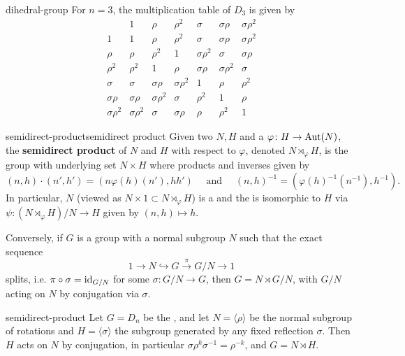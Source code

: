 \begin{example}{dihedral-group}
    For $n = 3$, the multiplication table of $D_3$ is given by
    \[ \begin{array}{c||c|c|c|c|c|c} 
           & 1 & \rho & \rho^2 & \sigma & \sigma \rho & \sigma \rho^2 \\ \hline \hline
         1 & 1 & \rho & \rho^2 & \sigma & \sigma \rho & \sigma \rho^2 \\ \hline
         \rho & \rho & \rho^2 & 1 & \sigma \rho^2 & \sigma & \sigma \rho \\ \hline
         \rho^2 & \rho^2 & 1 & \rho & \sigma \rho & \sigma \rho^2 & \sigma \\ \hline
         \sigma & \sigma & \sigma \rho & \sigma \rho^2 & 1 & \rho & \rho^2 \\ \hline
         \sigma \rho & \sigma \rho & \sigma \rho^2 & \sigma & \rho^2 & 1 & \rho \\ \hline
         \sigma \rho^2 & \sigma \rho^2 & \sigma & \sigma \rho & \rho & \rho^2 & 1
    \end{array} \]
\end{example}

\begin{topic}{semidirect-product}{semidirect product}
    Given two  $N, H$ and a  $\varphi \colon H \to \textup{Aut}(N)$, the \textbf{semidirect product} of $N$ and $H$ with respect to $\varphi$, denoted $N \rtimes_\varphi H$, is the group with underlying set $N \times H$ where products and inverses given by
    \[ (n, h) \cdot (n', h') = (n \varphi(h)(n'), h h') \quad \text{ and } \quad (n, h)^{-1} = (\varphi(h)^{-1}(n^{-1}), h^{-1}) . \]
    In particular, $N$ (viewed as $N \times 1 \subset N \rtimes_\varphi H$) is a  and the  is isomorphic to $H$ via $\psi \colon (N \rtimes_\varphi H)/N \to H$ given by $(n, h) \mapsto h$.
    
    Conversely, if $G$ is a group with a normal subgroup $N$ such that the exact sequence
    \[ 1 \to N \hookrightarrow G \xrightarrow{\pi} G/N \to 1 \]
    splits, i.e. $\pi \circ \sigma = \textup{id}_{G/N}$ for some $\sigma \colon G/N \to G$, then $G = N \rtimes G/N$, with $G/N$ acting on $N$ by conjugation via $\sigma$.
\end{topic}

\begin{example}{semidirect-product}
    Let $G = D_{n}$ be the , and let $N = \langle \rho \rangle$ be the normal subgroup of rotations and $H = \langle \sigma \rangle$ the subgroup generated by any fixed reflection $\sigma$. Then $H$ acts on $N$ by conjugation, in particular $\sigma \rho^k \sigma^{-1} = \rho^{-k}$, and $G = N \rtimes H$.
\end{example}

